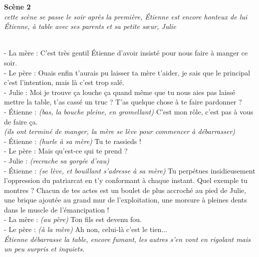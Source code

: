 \documentclass[french,12pt,amstex,a4paper]{article}
\begin{document}
\begin{center}
{\bf Scène 2}\\
{\it cette scène se passe le soir après la première, Étienne est encore honteux de lui}\\
{\it Étienne, à table avec ses parents et sa petite sœur, Julie}
\end{center}
\\
- La mère : C'est très gentil Étienne d'avoir insisté pour nous faire à manger ce soir.\\
- Le père : Ouais enfin t'aurais pu laisser ta mère t'aider, je sais que le principal c'est l'intention, mais là c'est trop salé.\\
- Julie : Moi je trouve ça louche ça quand même que tu nous aies pas laissé mettre la table, t'as cassé un truc ? T'as quelque chose à te faire pardonner ?\\
- Étienne : {\it (bas, la bouche pleine, en gromellant)} C'est mon rôle, c'est pas à vous de faire ça.\\
{\it (ils ont terminé de manger, la mère se lève pour commencer à débarrasser)}\\
- Étienne : {\it (hurle à sa mère)} Tu te rassieds !\\
- Le père : Mais qu'est-ce qui te prend ?\\
- Julie : {\it (recrache sa gorgée d'eau)}\\
- Étienne : {\it (se lève, et bouillant s'adresse à sa mère)} Tu perpétues insidieusement l'oppression du patriarcat en t'y conformant à chaque instant. Quel exemple tu montres ? Chacun de tes actes est un boulet de plus accroché au pied de Julie, une brique ajoutée au grand mur de l'exploitation, une morsure à pleines dents dans le muscle de l'émancipation !\\
- La mère : {\it (au père)} Ton fils est devenu fou.\\
- Le père : {\it (à la mère)} Ah non, celui-là c'est le tien...\\
{\it Étienne débarrasse la table, encore fumant, les autres s'en vont en rigolant mais un peu surpris et inquiets.}
\end{document}
